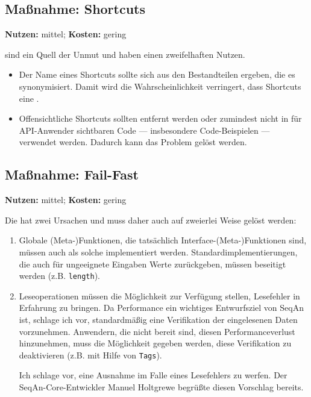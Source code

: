 \subsection{Maßnahme: Shortcuts}
\textbf{Nutzen:} mittel; \textbf{Kosten:} gering

 sind ein Quell der Unmut und haben einen zweifelhaften Nutzen.

\begin{itemize}
  \item Der Name eines Shortcuts sollte sich aus den Bestandteilen ergeben, die es synonymisiert. Damit wird die Wahrscheinlichkeit verringert, dass Shortcuts eine .
  \item Offensichtliche Shortcuts sollten entfernt werden oder zumindest nicht in für API-Anwender sichtbaren Code --- insbesondere Code-Beispielen --- verwendet werden. Dadurch kann das Problem  gelöst werden.
\end{itemize}









\subsection{Maßnahme: Fail-Fast}
\textbf{Nutzen:} mittel; \textbf{Kosten:} gering

Die  hat zwei Ursachen und muss daher auch auf zweierlei Weise gelöst werden:
\begin{enumerate}
  \item Globale (Meta-)Funktionen, die tatsächlich Interface-(Meta-)Funktionen sind, müssen auch als solche implementiert werden. Standardimplementierungen, die auch für ungeeignete Eingaben Werte zurückgeben, müssen beseitigt werden (z.B. \texttt{length}).
  \item Leseoperationen müssen die Möglichkeit zur Verfügung stellen, Lesefehler in Erfahrung zu bringen. Da Performance ein wichtiges Entwurfsziel von SeqAn ist, schlage ich vor, standardmäßig eine Verifikation der eingelesenen Daten vorzunehmen. Anwendern, die nicht bereit sind, diesen Performanceverlust hinzunehmen, muss die Möglichkeit gegeben werden, diese Verifikation zu deaktivieren (z.B. mit Hilfe von \texttt{Tags}).
  
  Ich schlage vor, eine Ausnahme im Falle eines Lesefehlers zu werfen. Der SeqAn-Core-Entwickler Manuel Holtgrewe begrüßte diesen Vorschlag bereits. 
\end{enumerate}


